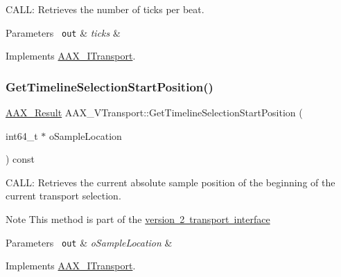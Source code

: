 C\+A\+LL\+: Retrieves the number of ticks per beat. 


\begin{DoxyParams}[1]{Parameters}
\mbox{\texttt{ out}}  & {\em ticks} & \\
\hline
\end{DoxyParams}


Implements \mbox{\hyperlink{a01885_aa5cfd6fef3e4950583ec1e050be692ec}{A\+A\+X\+\_\+\+I\+Transport}}.

\mbox{\label{a01941_a0d7fbac53fc8237cdf097de474bc30b9}} 
\subsubsection{\texorpdfstring{GetTimelineSelectionStartPosition()}{GetTimelineSelectionStartPosition()}}
{\footnotesize\ttfamily \mbox{\hyperlink{a00392_a4d8f69a697df7f70c3a8e9b8ee130d2f}{A\+A\+X\+\_\+\+Result}} A\+A\+X\+\_\+\+V\+Transport\+::\+Get\+Timeline\+Selection\+Start\+Position (\begin{DoxyParamCaption}\item[{int64\+\_\+t $\ast$}]{o\+Sample\+Location }\end{DoxyParamCaption}) const\hspace{0.3cm}{\ttfamily [virtual]}}



C\+A\+LL\+: Retrieves the current absolute sample position of the beginning of the current transport selection. 

\begin{DoxyNote}{Note}
This method is part of the \mbox{\hyperlink{a01761}{version 2 transport interface}}
\end{DoxyNote}

\begin{DoxyParams}[1]{Parameters}
\mbox{\texttt{ out}}  & {\em o\+Sample\+Location} & \\
\hline
\end{DoxyParams}


Implements \mbox{\hyperlink{a01885_a639677fc4237183baac85d00f1a5f6d5}{A\+A\+X\+\_\+\+I\+Transport}}.

\mbox{\label{a01941_af0501383f3cee8962c0d29c9bc32de53}} 
